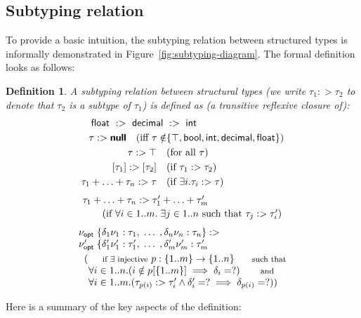 \documentclass[10pt]{sigplanconf}
\newtheorem{definition}{Definition}
\newcommand{\kvd}[1]{\textbf{\sffamily #1}}
\newcommand{\ident}[1]{\textnormal{\sffamily #1}}
\begin{document}

\subsection{Subtyping relation}
\label{sec:inference-subtyping}

To provide a basic intuition, the subtyping relation between structured types is
informally demonstrated in Figure~\ref{fig:subtyping-diagram}. The formal definition
looks as follows:

\begin{definition}
A subtyping relation between structural types (we write $\tau_1 :> \tau_2$ to denote
that $\tau_2$ is a subtype of $\tau_1$) is defined as (a transitive reflexive closure of):
%
\begin{align}
\label{eq:sub-num}
\ident{float}~:>~\ident{decimal}~&:>~\ident{int}\\
\label{eq:sub-null}
\tau :> \kvd{null} \quad (\textnormal{iff}~\tau \notin &\{\top, \ident{bool}, \ident{int}, \ident{decimal}, \ident{float} \})\\
\label{eq:sub-top}
\tau :> \top \quad &(\textnormal{for all}~\tau)\\
\label{eq:sub-col}
[\tau_1] :> [\tau_2] \quad &(\textnormal{if}~\tau_1 :> \tau_2)\\
\label{eq:sub-union1}
\tau_1 + \ldots + \tau_n :> \tau \quad &(\textnormal{if}~\exists i . \tau_i :> \tau)
\end{align}
\vspace{-1.5em}
\begin{equation}
\label{eq:sub-union2}
\begin{array}{l}
\tau_1 + \ldots + \tau_n :> \tau_1' + \ldots + \tau_m' \quad \\[0.2em]
\quad\quad (\textnormal{if}~\forall i \in 1 .. m. \;\exists j \in 1 .. n~\textnormal{such}~\textnormal{that}~\tau_j :> \tau_i')
\end{array}
\end{equation}
\vspace{-0.4em}
\begin{equation}
\label{eq:sub-record}
\begin{array}{l}
\nu_{\ident{opt}} \; \{ \delta_1 \nu_1 : \tau_1, \; \ldots \; , \delta_n \nu_n : \tau_n \} :>\\
\nu_{\ident{opt}}' \; \{ \delta_1' \nu_1' : \tau_1', \; \ldots \; , \delta_m' \nu_m' : \tau_m'\\[0.3em]
\;\;(\textnormal{\small if $\exists$ injective}~p : \{1 .. m\} \rightarrow \{1 .. n\}~\textnormal{\small such that}\\
\quad\forall i \in 1 .. n. (i \notin p[\{1 .. m\}] \implies \delta_i = ?)~\textnormal{\small and}\\
\quad\forall i \in 1 .. m. (\tau_{p(i)} :> \tau_i' \wedge \delta_i' = ? \implies \delta_{p(i)} = ? ) )
\end{array}
\end{equation}
\end{definition}
%
\noindent
Here is a summary of the key aspects of the definition:
\end{document}
